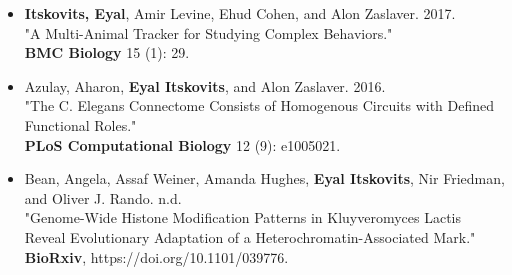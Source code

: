 \documentclass{tccv_Eyal}
\begin{document}
\begin{itemize}
    \textbf{eLife} 7 (February). https://doi.org/10.7554/eLife.31220. \textbf{(Joint first author)}
    \item
    \textbf{Itskovits, Eyal}, Amir Levine, Ehud Cohen, and Alon Zaslaver. 2017. \\
    "A Multi-Animal Tracker for Studying Complex Behaviors." \\
    \textbf{BMC Biology} 15 (1): 29.
    \item
    Azulay, Aharon, \textbf{Eyal Itskovits}, and Alon Zaslaver. 2016. \\
    "The C. Elegans Connectome Consists of Homogenous Circuits with Defined Functional Roles." \\
    \textbf{PLoS Computational Biology} 12 (9): e1005021.
    \item
    Bean, Angela, Assaf Weiner, Amanda Hughes, \textbf{Eyal Itskovits}, Nir Friedman, and Oliver J. Rando. n.d. \\
    "Genome-Wide Histone Modification Patterns in Kluyveromyces Lactis Reveal Evolutionary Adaptation of a Heterochromatin-Associated Mark." \\
    \textbf{BioRxiv}, https://doi.org/10.1101/039776.
\end{itemize}
\end{document}
